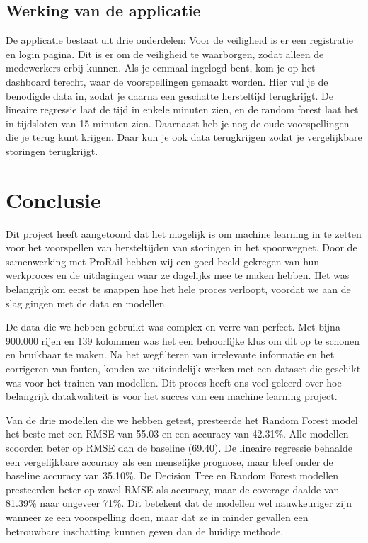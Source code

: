 \documentclass{article}
\begin{document}
\subsection{Werking van de applicatie}
De applicatie bestaat uit drie onderdelen: Voor de veiligheid is er een registratie en login pagina. Dit is er om de veiligheid te waarborgen, zodat alleen de medewerkers erbij kunnen. Als je eenmaal ingelogd bent, kom je op het dashboard terecht, waar de voorspellingen gemaakt worden. Hier vul je de benodigde data in, zodat je daarna een geschatte hersteltijd terugkrijgt. De lineaire regressie laat de tijd in enkele minuten zien, en de random forest laat het in tijdsloten van 15 minuten zien. Daarnaast heb je nog de oude voorspellingen die je terug kunt krijgen. Daar kun je ook data terugkrijgen zodat je vergelijkbare storingen terugkrijgt.

\newpage
\section{Conclusie}

Dit project heeft aangetoond dat het mogelijk is om machine learning in te zetten voor het voorspellen van hersteltijden van storingen in het spoorwegnet. Door de samenwerking met ProRail hebben wij een goed beeld gekregen van hun werkproces en de uitdagingen waar ze dagelijks mee te maken hebben. Het was belangrijk om eerst te snappen hoe het hele proces verloopt, voordat we aan de slag gingen met de data en modellen.

De data die we hebben gebruikt was complex en verre van perfect. Met bijna 900.000 rijen en 139 kolommen was het een behoorlijke klus om dit op te schonen en bruikbaar te maken. Na het wegfilteren van irrelevante informatie en het corrigeren van fouten, konden we uiteindelijk werken met een dataset die geschikt was voor het trainen van modellen. Dit proces heeft ons veel geleerd over hoe belangrijk datakwaliteit is voor het succes van een machine learning project.

Van de drie modellen die we hebben getest, presteerde het Random Forest model het beste met een RMSE van 55.03 en een accuracy van 42.31\%. Alle modellen scoorden beter op RMSE dan de baseline (69.40). De lineaire regressie behaalde een vergelijkbare accuracy als een menselijke prognose, maar bleef onder de baseline accuracy van 35.10\%. De Decision Tree en Random Forest modellen presteerden beter op zowel RMSE als accuracy, maar de coverage daalde van 81.39\% naar ongeveer 71\%. Dit betekent dat de modellen wel nauwkeuriger zijn wanneer ze een voorspelling doen, maar dat ze in minder gevallen een betrouwbare inschatting kunnen geven dan de huidige methode.
\end{document}
